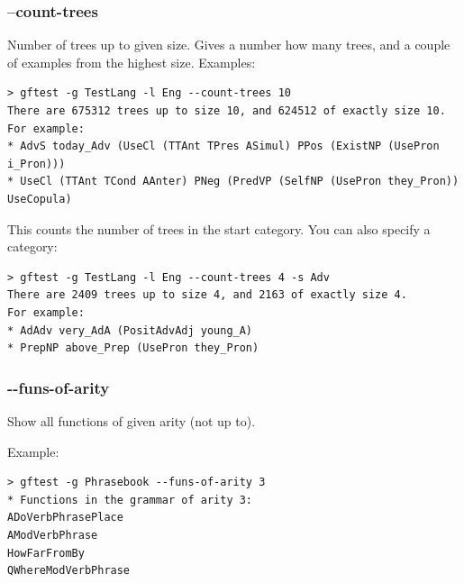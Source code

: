 \hypertarget{count-trees}{%
\subsubsection{--count-trees}\label{count-trees}}

Number of trees up to given size. Gives a number how many trees, and a
couple of examples from the highest size. Examples:

\begin{verbatim}
> gftest -g TestLang -l Eng --count-trees 10
There are 675312 trees up to size 10, and 624512 of exactly size 10.
For example:
* AdvS today_Adv (UseCl (TTAnt TPres ASimul) PPos (ExistNP (UsePron i_Pron)))
* UseCl (TTAnt TCond AAnter) PNeg (PredVP (SelfNP (UsePron they_Pron)) UseCopula)
\end{verbatim}

This counts the number of trees in the start category. You can also
specify a category:

\begin{verbatim}
> gftest -g TestLang -l Eng --count-trees 4 -s Adv
There are 2409 trees up to size 4, and 2163 of exactly size 4.
For example:
* AdAdv very_AdA (PositAdvAdj young_A)
* PrepNP above_Prep (UsePron they_Pron)
\end{verbatim}

\hypertarget{funs-of-arity}{%
\subsubsection{-\/-funs-of-arity}\label{funs-of-arity}}

Show all functions of given arity (not up to).

Example:

\begin{verbatim}
> gftest -g Phrasebook --funs-of-arity 3
* Functions in the grammar of arity 3:
ADoVerbPhrasePlace
AModVerbPhrase
HowFarFromBy
QWhereModVerbPhrase
\end{verbatim}
